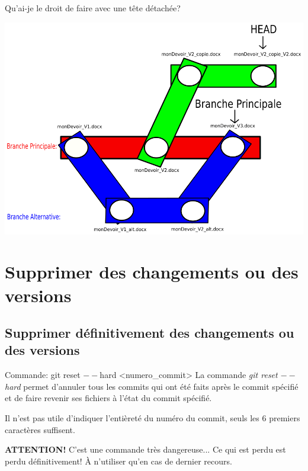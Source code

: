 \documentclass{beamer}
\begin{document}
\begin{frame}{Qu'ai-je le droit de faire avec une tête détachée?}
    \begin{center}
        \includegraphics[scale=0.35]{images/detachedHead/detachedHead3.png}
    \end{center}
\end{frame}



\section{Supprimer des changements ou des versions}

\subsection{Supprimer définitivement des changements ou des versions}
\begin{frame}{Commande: git reset $--$hard <numero\_commit>}
La commande \textit{git reset $--$hard} permet d'annuler tous les commits qui ont été faits après le commit spécifié et de faire revenir ses fichiers à l'état du commit spécifié.
\medskip

Il n'est pas utile d'indiquer l'entièreté du numéro du commit, seuls les 6 premiers caractères suffisent.
\medskip

\textbf{ATTENTION!} C'est une commande très dangereuse... Ce qui est perdu est perdu définitivement! À n'utiliser qu'en cas de dernier recours.
\end{frame}
\end{document}
